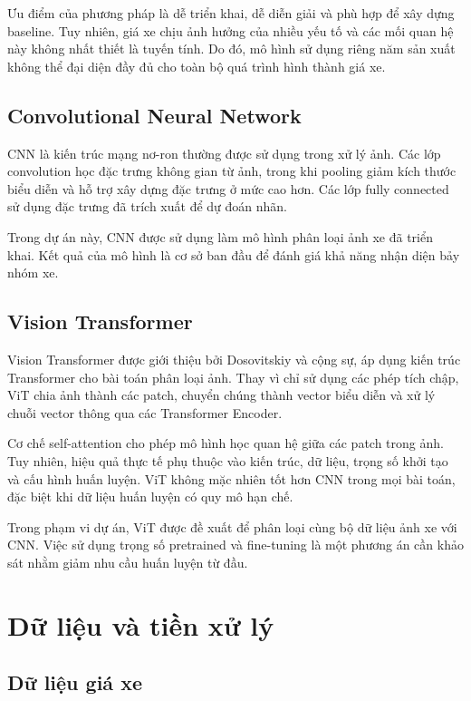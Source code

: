 \documentclass[runningheads]{llncs}
\begin{document}
Ưu điểm của phương pháp là dễ triển khai, dễ diễn giải và
phù hợp để xây dựng baseline. Tuy nhiên, giá xe chịu ảnh
hưởng của nhiều yếu tố và các mối quan hệ này không nhất
thiết là tuyến tính. Do đó, mô hình sử dụng riêng năm sản
xuất không thể đại diện đầy đủ cho toàn bộ quá trình hình
thành giá xe.

\subsection{Convolutional Neural Network}

CNN là kiến trúc mạng nơ-ron thường được sử dụng trong xử
lý ảnh. Các lớp convolution học đặc trưng không gian từ
ảnh, trong khi pooling giảm kích thước biểu diễn và hỗ trợ
xây dựng đặc trưng ở mức cao hơn. Các lớp fully connected
sử dụng đặc trưng đã trích xuất để dự đoán nhãn.

Trong dự án này, CNN được sử dụng làm mô hình phân loại
ảnh xe đã triển khai. Kết quả của mô hình là cơ sở ban đầu
để đánh giá khả năng nhận diện bảy nhóm xe.

\subsection{Vision Transformer}

Vision Transformer được giới thiệu bởi Dosovitskiy và cộng
sự, áp dụng kiến trúc Transformer cho bài toán phân loại
ảnh. Thay vì chỉ sử dụng các phép tích chập, ViT chia ảnh
thành các patch, chuyển chúng thành vector biểu diễn và
xử lý chuỗi vector thông qua các Transformer Encoder.

Cơ chế self-attention cho phép mô hình học quan hệ giữa
các patch trong ảnh. Tuy nhiên, hiệu quả thực tế phụ thuộc
vào kiến trúc, dữ liệu, trọng số khởi tạo và cấu hình huấn
luyện. ViT không mặc nhiên tốt hơn CNN trong mọi bài toán,
đặc biệt khi dữ liệu huấn luyện có quy mô hạn chế.

Trong phạm vi dự án, ViT được đề xuất để phân loại cùng
bộ dữ liệu ảnh xe với CNN. Việc sử dụng trọng số pretrained
và fine-tuning là một phương án cần khảo sát nhằm giảm
nhu cầu huấn luyện từ đầu.

\section{Dữ liệu và tiền xử lý}

\subsection{Dữ liệu giá xe}
\end{document}
